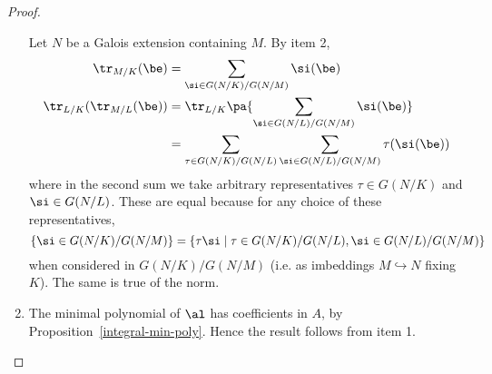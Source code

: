 \begin{proof}
\begin{enumerate}
Let $N$ be a Galois extension containing $M$. 
By item 2,
\begin{align*}
\tr_{M/K}(\be)&=\sum_{\si\in G(N/K)/G(N/M)}\si(\be)\\
\tr_{L/K}(\tr_{M/L}(\be))&=\tr_{L/K}\pa{
\sum_{\si\in G(N/L)/G(N/M)}\si(\be)
}\\
&=\sum_{\tau\in G(N/K)/G(N/L)}\sum_{\si\in G(N/L)/G(N/M)}\tau(\si(\be))
\end{align*}
where in the second sum we take arbitrary representatives $\tau\in G(N/K)$ and $\si\in G(N/L)$.
These are equal because for any choice of these representatives, 
\[\{\si\in G(N/K)/G(N/M)\}=\{\tau\si\mid \tau\in G(N/K)/G(N/L),\si\in G(N/L)/G(N/M)\}\]
when considered in $G(N/K)/G(N/M)$ (i.e. as imbeddings $M\hookrightarrow N$ fixing $K$). 
The same is true of the norm.
\item 
The minimal polynomial of $\al$ has coefficients in $A$, by Proposition~\ref{integral-min-poly}. Hence the result follows from item 1.
%
\end{enumerate}
\end{proof}
